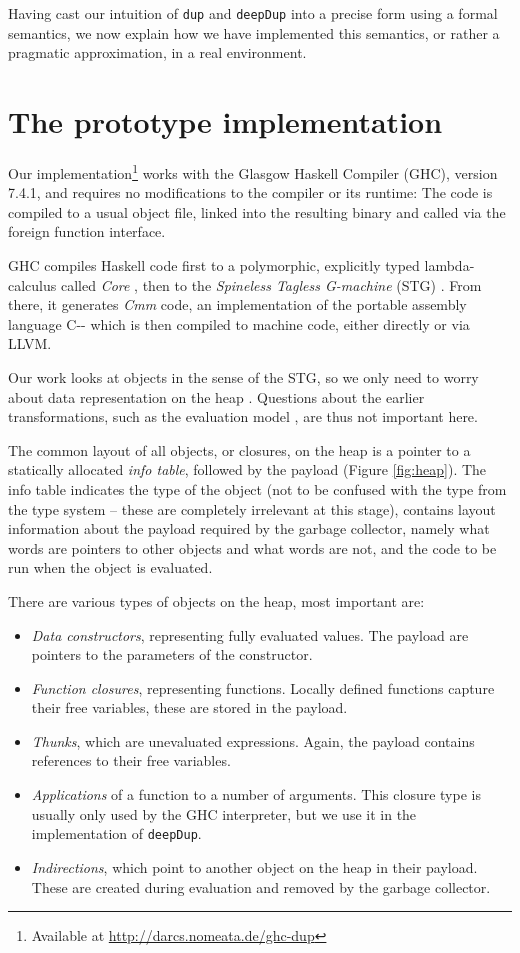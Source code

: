 \documentclass[preprint]{sigplanconf}
\theoremstyle{nonumberplain}
\newcommand{\li}{\lstinline[style=Haskell]}
\begin{document}
Having cast our intuition of \li-dup- and \li-deepDup- into a precise form using a formal semantics, we now explain how we have implemented this semantics, or rather a pragmatic approximation, in a real environment.

\section{The prototype implementation}
\label{sec:prototype}

Our implementation\footnote{Available at \url{http://darcs.nomeata.de/ghc-dup}} works with the Glasgow Haskell Compiler (GHC), version 7.4.1, and requires no modifications to the compiler or its runtime: The code is compiled to a usual object file, linked into the resulting binary and called via the foreign function interface.

GHC compiles Haskell code first to a polymorphic, explicitly typed lambda-calculus called \emph{Core} \citep{core,system-fc}, then to the \emph{Spineless Tagless G-machine} (STG) \citep{stg}. From there, it generates \emph{Cmm} code, an implementation of the portable assembly language C-{}- which is then compiled to machine code, either directly or via LLVM.

Our work looks at objects in the sense of the STG, so we only need to worry about data representation on the heap \citep{stg}. Questions about the earlier transformations,  such as the evaluation model \cite{evalapply}, are thus not important here.

The common layout of all objects, or closures,  on the heap is a pointer to a statically allocated \emph{info table}, followed by the payload (Figure \ref{fig:heap}). The info table indicates the type of the object (not to be confused with the type from the type system – these are completely irrelevant at this stage), contains layout information about the payload required by the garbage collector, namely what words are pointers to other objects and what words are not, and the code to be run when the object is evaluated.

There are various types of objects on the heap, most important are:
\begin{itemize}
\item \emph{Data constructors}, representing fully evaluated values. The payload are pointers to the parameters of the constructor.
\item \emph{Function closures}, representing functions. Locally defined functions capture their free variables, these are stored in the payload.
\item \emph{Thunks}, which are unevaluated expressions. Again, the payload contains references to their free variables.
\item \emph{Applications} of a function to a number of arguments. This closure type is usually only used by the GHC interpreter, but we use it in the implementation of \li-deepDup-.
\item \emph{Indirections}, which point to another object on the heap in their payload. These are created during evaluation and removed by the garbage collector.
\end{itemize}
\end{document}
